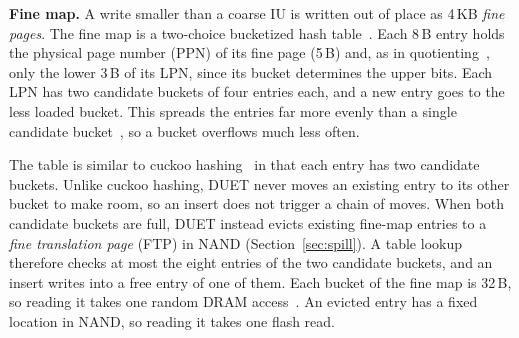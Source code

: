 \textbf{Fine map.} A write smaller than a coarse IU is written out of place as 4\,KB
\emph{fine pages}. The fine map is a two-choice
bucketized hash table~\cite{balanced}. Each 8\,B entry holds the physical page number (PPN) of its fine page (5\,B) and, as in
quotienting~\cite{quotient}, only the lower 3\,B of its LPN, since its bucket determines the upper bits.
Each LPN has two candidate buckets of four
entries each, and a new entry goes to the less loaded bucket. This spreads the entries far more evenly than a single candidate
bucket~\cite{balanced}, so a bucket overflows much less often.

The table is similar to cuckoo hashing~\cite{cuckoo} in that each entry has two
candidate buckets. Unlike cuckoo hashing, DUET never moves an existing entry to
its other bucket to make room, so an insert does not trigger a chain of moves.
When both candidate buckets are full, DUET instead evicts existing fine-map entries to a
\emph{fine translation page} (FTP) in NAND (Section~\ref{sec:spill}). A table lookup therefore checks at most the eight
entries of the two candidate buckets, and an insert writes into a free entry of
one of them. Each bucket of the fine map is 32\,B, so reading
it takes one random DRAM access~\cite{samsung-ddr4,rixner}. An evicted entry has a fixed location in NAND, so reading
it takes one flash read.

